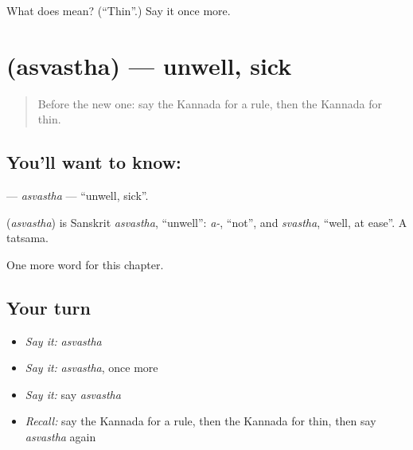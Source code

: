 \begin{tcolorbox}[breakable,colback=teal!4,colframe=teal!35!black,title={Before you move on}]
What does  mean? (\textquotedblleft{}Thin\textquotedblright{}.) Say it once more.
\end{tcolorbox}
\section[\texorpdfstring{\kn{ಅಸ್ವಸ್ಥ} (asvastha)}{ಅಸ್ವಸ್ಥ (asvastha)}]{ (asvastha) — unwell, sick}

\label{lesson:KA-C254-asvastha}



\begin{quote}
Before the new one: say the Kannada for a rule, then the Kannada for thin.
\end{quote}

\subsection*{You'll want to know: }
\textbf{} — \emph{asvastha} — \textquotedblleft{}unwell, sick\textquotedblright{}.

\begin{cousinweb}
\textbf{} (\emph{asvastha}) is Sanskrit \emph{asvastha}, \textquotedblleft{}unwell\textquotedblright{}: \emph{a-}, \textquotedblleft{}not\textquotedblright{}, and \emph{svastha}, \textquotedblleft{}well, at ease\textquotedblright{}. A tatsama.
\end{cousinweb}

\begin{grammarlens}[title={What you've built}]
One more word for this chapter.
\end{grammarlens}

\subsection*{Your turn}
\begin{itemize}
\raggedright
  \item \emph{Say it:} \emph{asvastha}
  \item \emph{Say it:} \emph{asvastha}, once more
  \item \emph{Say it:} say \emph{asvastha}
  \item \emph{Recall:} say the Kannada for a rule, then the Kannada for thin, then say \emph{asvastha} again
\end{itemize}

